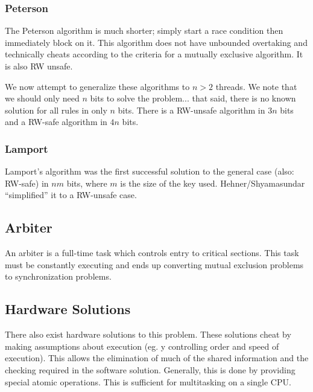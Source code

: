 \documentclass[12pt]{article}
\begin{document}
\subsubsection{Peterson}
The Peterson algorithm is much shorter; simply start a race condition then immediately block on it. This algorithm does not have unbounded overtaking and technically cheats according to the criteria for a mutually exclusive algorithm. It is also RW unsafe.

We now attempt to generalize these algorithms to $n > 2$ threads. We note that we should only need $n$ bits to solve the problem... that said, there is no known solution for all rules in only $n$ bits. There is a RW-unsafe algorithm in $3n$ bits and a RW-safe algorithm in $4n$ bits.

\subsubsection{Lamport}
Lamport's algorithm was the first successful solution to the general case (also: RW-safe) in $nm$ bits, where $m$ is the size of the key used. Hehner/Shyamasundar ``simplified'' it to a RW-unsafe case.


\subsection{Arbiter}
An arbiter is a full-time task which controls entry to critical sections. This task must be constantly executing and ends up converting mutual exclusion problems to synchronization problems.

\subsection{Hardware Solutions}
There also exist hardware solutions to this problem. These solutions cheat by making assumptions about execution (eg. y controlling order and speed of execution). This allows the elimination of much of the shared information and the checking required in the software solution. Generally, this is done by providing special atomic operations. This is sufficient for multitasking on a single CPU.
\end{document}
